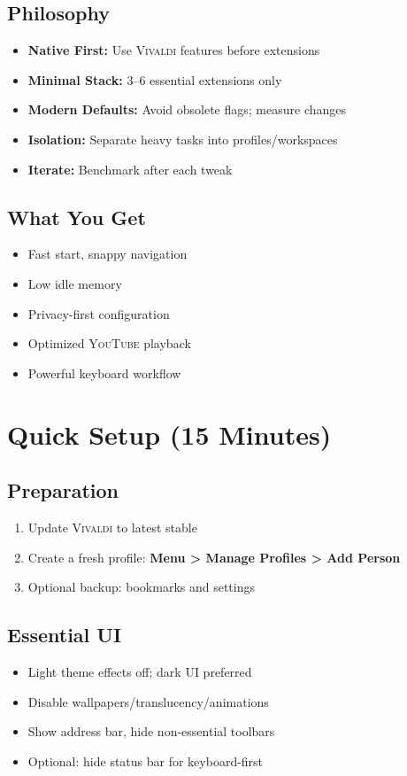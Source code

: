 \documentclass[10pt,a4paper,oneside]{book}
\newcommand{\vivaldi}{\textsc{Vivaldi}}
\newcommand{\youtube}{\textsc{YouTube}}
\newcommand{\menupath}[1]{\textbf{\color{textlight}#1}}
\begin{document}
\begin{multicols}{2}
\section{Philosophy}
\begin{itemize}
  \item \textbf{Native First:} Use \vivaldi{} features before extensions
  \item \textbf{Minimal Stack:} 3--6 essential extensions only
  \item \textbf{Modern Defaults:} Avoid obsolete flags; measure changes
  \item \textbf{Isolation:} Separate heavy tasks into profiles/workspaces
  \item \textbf{Iterate:} Benchmark after each tweak
\end{itemize}

\section{What You Get}
\begin{itemize}
  \item Fast start, snappy navigation
  \item Low idle memory
  \item Privacy-first configuration
  \item Optimized \youtube{} playback
  \item Powerful keyboard workflow
\end{itemize}
\end{multicols}

\chapter{Quick Setup (15 Minutes)}
\section{Preparation}
\begin{enumerate}
  \item Update \vivaldi{} to latest stable
  \item Create a fresh profile: \menupath{Menu > Manage Profiles > Add Person}
  \item Optional backup: bookmarks and settings
\end{enumerate}

\section{Essential UI}
\begin{itemize}
  \item Light theme effects off; dark UI preferred
  \item Disable wallpapers/translucency/animations
  \item Show address bar, hide non-essential toolbars
  \item Optional: hide status bar for keyboard-first
\end{itemize}
\end{document}
